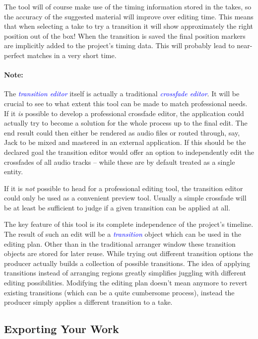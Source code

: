 \documentclass[11pt,a4paper]{article}
\newcommand*{\term}[1]{\textcolor{blue}{\emph{#1}}}
\begin{document}
The tool will of course make use of the timing information stored in the takes,
so the accuracy of the suggested material will improve over editing time.
This means that when selecting a take to try a transition it will show
approximately the right position out of the box!
When the transition is saved the final position markers are implicitly added
to the project's timing data. This will probably lead to near-perfect matches
in a very short time.

\paragraph{Note:}
The \term{transition editor} itself is actually a traditional \term{crossfade editor}.
It will be crucial to see to what extent this tool can be made to match
professional needs.
If it \emph{is} possible to develop a professional crossfade editor, the application
could actually try to become a solution for the whole process up to the final edit.
The end result could then either be rendered as audio files or routed through, say,
Jack to be mixed and mastered in an external application.
If this should be the declared goal the transition editor would offer an option to independently edit the crossfades of all audio tracks -- while these are by default
treated as a single entity.

If it is \emph{not} possible to head for a professional editing tool, the transition
editor could only be used as a convenient preview tool. Usually a simple crossfade 
will be at least be sufficient to judge if a given transition can be applied at all.

\medskip
The key feature of this tool is its complete independence of the
project's timeline.
The result of such an edit will be a \term{transition} object which can be used
in the editing plan. Other than in the traditional arranger window these transition
objects are stored for later reuse. While trying out different transition options
the producer actually builds a collection of possible transitions. The idea of
applying transitions instead of arranging regions greatly simplifies juggling with
different editing possibilities. Modifying the editing plan doesn't mean anymore to
revert existing transitions (which can be a quite cumbersome process), instead the
producer simply applies a different transition to a take.

\subsection{Exporting Your Work}
\end{document}
